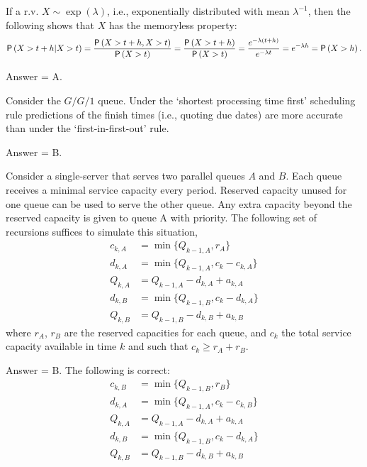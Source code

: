 \begin{exercise}[201802]
If a r.v. $X\sim\exp(\lambda)$, i.e., exponentially distributed with mean $\lambda^{-1}$, then the following shows that $X$ has the memoryless property:
\begin{equation*}
 \P{X>t+h|X>t} = \frac{\P{X>t+h, X>t}}{\P{X>t}} = \frac{\P{X>t+h}}{\P{X>t}} = \frac{e^{-\lambda(t+h)}}{e^{-\lambda t}} = e^{-\lambda h} = \P{X>h}.
\end{equation*}

\begin{solution}
Answer = A.
\end{solution}
\end{exercise}

\begin{exercise}[201803]
Consider the $G/G/1$ queue. Under the `shortest processing time first' scheduling rule predictions of the finish times (i.e., quoting due dates) are more accurate than under the `first-in-first-out' rule.
\begin{solution}
Answer = B.
\end{solution}
\end{exercise}

\begin{exercise}[201803]
 Consider a single-server that serves two parallel queues $A$ and $B$. Each queue receives a minimal service capacity every period. Reserved capacity unused for one queue can be
 used to serve the other queue. Any extra capacity beyond the
 reserved capacity is given to queue A with priority. The following set
 of recursions suffices to simulate this situation,
\begin{align*}
 c_{k,A} &= \min\{Q_{ k-1, A}, r_A\}\\
d_{k,A} &= \min\{Q_{k-1, A}, c_k-c_{k,A}\}\\
Q_{k,A} &= Q_{k-1, A} - d_{k,A} + a_{k,A}\\
d_{k,B} &= \min\{Q_{k-1, B}, c_k-d_{k,A}\} \\
Q_{k,B} &= Q_{k-1, B} - d_{k,B} + a_{k,B}
\end{align*}
where $r_A$, $r_B$ are the reserved capacities for each queue, and $c_k$ the total service capacity available in time $k$ and such that $c_k \geq r_A+r_B$.

\begin{solution}
Answer = B. The following is correct: 
\begin{align*}
 c_{k,B} &= \min\{Q_{ k-1, B}, r_B\}\\
d_{k,A} &= \min\{Q_{k-1, A}, c_k-c_{k,B}\}\\
Q_{k,A} &= Q_{k-1, A} - d_{k,A} + a_{k,A}\\
d_{k,B} &= \min\{Q_{k-1, B}, c_k-d_{k,A}\}\\
Q_{k,B} &= Q_{k-1, B} - d_{k,B} + a_{k,B}
\end{align*}
\end{solution}
\end{exercise}

